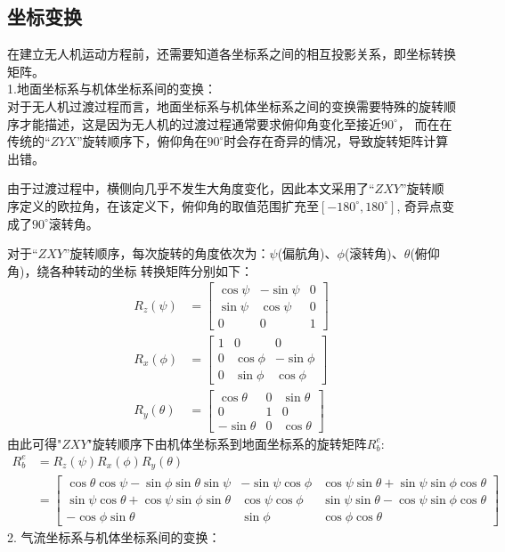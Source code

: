 \subsection{坐标变换}
在建立无人机运动方程前，还需要知道各坐标系之间的相互投影关系，即坐标转换矩阵。\\
1.地面坐标系与机体坐标系间的变换：\\

对于无人机过渡过程而言，地面坐标系与机体坐标系之间的变换需要特殊的旋转顺序才能描述，这是因为无人机的过渡过程通常要求俯仰角变化至接近$90^\circ$，
而在在传统的“$ZYX$”旋转顺序下，俯仰角在$90^\circ$时会存在奇异的情况，导致旋转矩阵计算出错。

由于过渡过程中，横侧向几乎不发生大角度变化，因此本文采用了“$ZXY$”旋转顺序定义的欧拉角，在该定义下，俯仰角的取值范围扩充至$\left [ -180^\circ,180^\circ \right ]$,
奇异点变成了$90^\circ$滚转角。

对于“$ZXY$”旋转顺序，每次旋转的角度依次为：$\psi$(偏航角)、$\phi$(滚转角)、$\theta$(俯仰角)，绕各种转动的坐标
转换矩阵分别如下：
\begin{align}
    R_{z}(\psi) & = \begin{bmatrix}
    \cos\psi&  -\sin\psi& 0\\
    \sin\psi&  \cos\psi& 0\\
    0&  0& 1
    \end{bmatrix}\\
    R_{x}(\phi) & = \begin{bmatrix}
    1&  0& 0\\
    0&  \cos\phi& -\sin\phi\\
    0&  \sin\phi& \cos\phi
    \end{bmatrix}\\
    R_{y}(\theta) & = \begin{bmatrix}
    \cos\theta&  0& \sin\theta\\
    0&  1& 0\\
    -\sin\theta&  0& \cos\theta
    \end{bmatrix}
\end{align}
由此可得"$ZXY$"旋转顺序下由机体坐标系到地面坐标系的旋转矩阵$R_{b}^{e}$:
\begin{align}
    R_{b}^{e} &= R_{z}(\psi)R_{x}(\phi)R_{y}(\theta) \nonumber \\
    &= \begin{bmatrix}
    \cos \theta\cos \psi -\sin \phi \sin \theta \sin \psi&  -\sin\psi\cos\phi& \cos\psi\sin\theta+\sin\psi\sin\phi\cos\theta  \\
    \sin\psi\cos\theta+\cos\psi\sin\phi\sin\theta&  \cos\psi\cos\phi& \sin\psi\sin\theta-\cos\psi\sin\phi\cos\theta\\
    -\cos\phi\sin\theta&  \sin\phi& \cos\phi\cos\theta
    \end{bmatrix}
\end{align}
2. 气流坐标系与机体坐标系间的变换：\\

